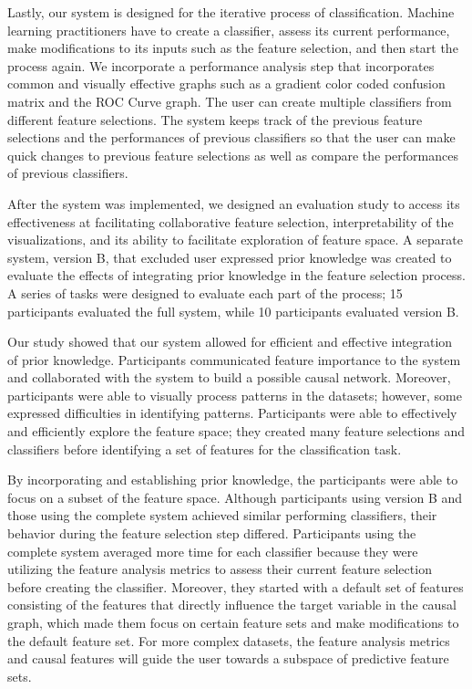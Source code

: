 Lastly, our system is designed for the iterative process of classification. Machine learning practitioners have to create a classifier, assess its current performance, make modifications to its inputs such as the feature selection, and then start the process again. We incorporate a performance analysis step that incorporates common and visually effective graphs such as a gradient color coded confusion matrix and the ROC Curve graph. The user can create multiple classifiers from different feature selections. The system keeps track of the previous feature selections and the performances of previous classifiers so that the user can make quick changes to previous feature selections as well as compare the performances of previous classifiers.

After the system was implemented, we designed an evaluation study to access its effectiveness at facilitating collaborative feature selection, interpretability of the visualizations, and its ability to facilitate exploration of feature space. A separate system, version B, that excluded user expressed prior knowledge was created to evaluate the effects of integrating prior knowledge in the feature selection process. A series of tasks were designed to evaluate each part of the process; 15 participants evaluated the full system, while 10 participants evaluated version B.

Our study showed that our system allowed for efficient and effective integration of prior knowledge. Participants communicated feature importance to the system and collaborated with the system to build a possible causal network. Moreover, participants were able to visually process patterns in the datasets; however, some expressed difficulties in identifying patterns. Participants were able to effectively and efficiently explore the feature space; they created many feature selections and classifiers before identifying a set of features for the classification task.

By incorporating and establishing prior knowledge, the participants were able to focus on a subset of the feature space. Although participants using version B and those using the complete system achieved similar performing classifiers, their behavior during the feature selection step differed. Participants using the complete system averaged more time for each classifier because they were utilizing the feature analysis metrics to assess their current feature selection before creating the classifier. Moreover, they started with a default set of features consisting of the features that directly influence the target variable in the causal graph, which made them focus on certain feature sets and make modifications to the default feature set. For more complex datasets, the feature analysis metrics and causal features will guide the user towards a subspace of predictive feature sets.

